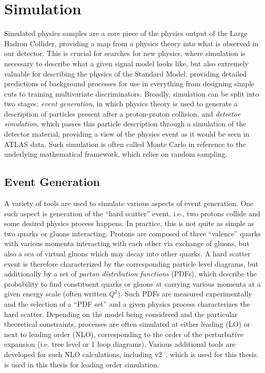 \chapter{Simulation}
\label{chap:simulation}

Simulated physics samples are a core piece of the physics output of the Large Hadron Collider, 
providing a map from a physics theory into what is observed in our detector. This is crucial for 
searches for new physics, where simulation is necessary to describe what a given signal model looks 
like, but also extremely valuable for describing the physics of the Standard Model, providing detailed 
predictions of background processes for use in everything from designing simple cuts to training 
multivariate discriminators. Broadly, simulation can be split into two stages: \emph{event generation}, in which 
physics theory is used to generate a description of particles present after a proton-proton collision, and 
\emph{detector simulation}, which passes this particle description through a simulation of the detector 
material, providing a view of the physics event as it would be seen in ATLAS data. Such simulation 
is often called Monte Carlo in reference to the underlying mathematical framework, which relies on random 
sampling. 

\section{Event Generation}
A variety of tools are used to simulate various aspects of event generation. 
One such aspect is generation of the ``hard scatter'' event, i.e., two protons collide and 
some desired physics process happens. In practice, this is not quite as simple as two quarks or 
gluons interacting. Protons are composed of three ``valence'' quarks with various momenta interacting 
with each other via exchange of gluons, but also a sea of virtual gluons which may decay into other
quarks. A hard scatter event is therefore characterized by the corresponding particle level 
diagrams, but additionally by a set of \emph{parton distribution functions} (PDFs), which describe the 
probability to find constituent quarks or gluons at carrying various momenta at a given energy 
scale (often written $Q^2$). Such PDFs are measured experimentally  and the selection 
of a ``PDF set'' and a given physics process characterizes the hard scatter. Depending on the model being 
considered and the particular theoretical constraints, processes are often simulated at either leading (LO) 
or next to leading order (NLO), corresponding to the order of the perturbative expansion (i.e. tree level 
or 1 loop diagrams). Various additional tools are developed for such NLO calculations, 
including \POWHEGBOX v2~\cite{Powheg1, Powheg2, Powheg3}, which is used for this thesis. \MADGRAPH\cite{MG5} is 
used in this thesis for leading order simulation.

